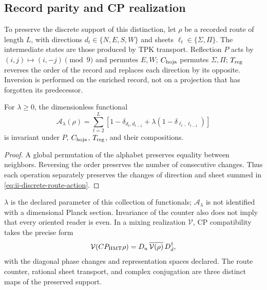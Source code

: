 \subsection{Record parity and CP realization}

To preserve the discrete support of this distinction, let \(\rho\) be a
recorded route of length \(L\), with directions
\(d_t\in\{N,E,S,W\}\) and sheets \(\ell_t\in\{\Sigma,\Pi\}\).
The intermediate states are those produced by TPK transport.
Reflection \(P\) acts by \((i,j)\mapsto(i,-j)\pmod9\) and
permutes \(E,W\); \(C_{\rm hoja}\) permutes \(\Sigma,\Pi\);
\(T_{\rm reg}\) reverses the order of the record and replaces each
direction by its opposite. Inversion is performed on the enriched
record, not on a projection that has forgotten its predecessor.

\begin{proposition}
For \(\lambda\ge0\), the dimensionless functional
\begin{equation}
 \mathcal A_\lambda(\rho)=
 \sum_{t=2}^{L}\left[1-\delta_{d_t,d_{t-1}}
             +\lambda(1-\delta_{\ell_t,\ell_{t-1}})\right]
 \label{eq:ii-discrete-route-action}
\end{equation}
is invariant under \(P\), \(C_{\rm hoja}\), \(T_{\rm reg}\), and
their compositions.
\end{proposition}

\begin{proof}
A global permutation of the alphabet preserves equality between neighbors.
Reversing the order preserves the number of consecutive changes.
Thus each operation separately preserves the changes of direction
and sheet summed in \eqref{eq:ii-discrete-route-action}.
\end{proof}

\(\lambda\) is the declared parameter of this collection of functionals;
\(\mathcal A_\lambda\) is not identified with a dimensional Planck
section. Invariance of the counter also does not imply that every oriented
reader is even. In a mixing realization \(\mathcal V\),
CP compatibility takes the precise form
\begin{equation}
 \mathcal V(CP_{\rm HMT}\rho)
 =D_u\,\overline{\mathcal V(\rho)}\,D_d^\dagger,
 \label{eq:ii-cp-square}
\end{equation}
with the diagonal phase changes and representation spaces
declared. The route counter, rational sheet transport, and
complex conjugation are three distinct maps of the preserved support.

